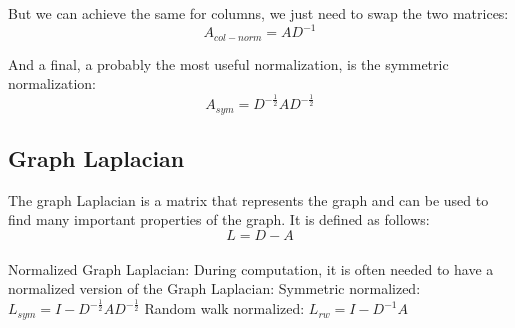 But we can achieve the same for columns, we just need to swap the two matrices:
\begin{equation}
    A_{col-norm} = A D^{-1}
\end{equation}

And a final, a probably the most useful normalization, is the symmetric normalization:
\begin{equation}
    A_{sym} =  D^{-\frac{1}{2}} A D^{-\frac{1}{2}}
\end{equation}


\subsection{Graph Laplacian}
The graph Laplacian is a matrix that represents the graph and can be used to find many important properties of the graph. 
It is defined as follows:
\begin{equation}
    L = D - A
\end{equation}

\paragraph{}{Normalized Graph Laplacian:}
During computation, it is often needed to have a normalized version of the Graph Laplacian: \newline
Symmetric normalized: $L_{sym} = I - D^{-\frac{1}{2}} A D^{-\frac{1}{2}}$ \newline
Random walk normalized: $L_{rw} = I - D^{-1} A$ \newline

%
%
%

